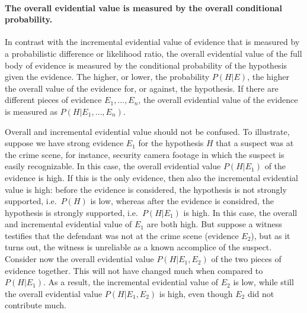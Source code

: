 \documentclass[10pt]{article}
\begin{document}


\paragraph{The overall evidential value is measured by the overall conditional probability. }

In contrast with the incremental evidential value of evidence that is measured by a probabilistic difference or likelihood ratio, the overall evidential value of the full body of evidence is measured by the conditional probability of the hypothesis given the evidence. The higher, or lower, the probability $P(H|E)$, the higher 
the overall value of the evidence for, or against, the hypothesis. If there are different pieces of evidence $E_1, \ldots, E_n$, the overall evidential value of the evidence is measured as $P(H|E_1, \ldots, E_n)$.

Overall and incremental evidential value should not be confused. To illustrate, suppose we have strong evidence $E_1$ for the hypothesis $H$ 
that a suspect was at the crime scene, for instance, security camera footage in which the suspect is easily recognizable. 
In this case, the overall evidential value $P(H|E_1)$ of the evidence is high. If this is the only evidence, then also the 
incremental evidential value is high: before the evidence is considered, the hypothesis is not strongly supported, i.e.\ $P(H)$ is low, whereas after the evidence is considred, 
the hypothesis is strongly supported, i.e.\ $P(H|E_1)$ is high. In this case, the overall and incremental evidential value of $E_1$ are both high. 
But suppose a witness testifies that the defendant was not at the crime scene (evidence $E_2$), but as it turns out, the witness is unreliable 
as a known accomplice of the suspect. Consider now the overall evidential value $P(H|E_1, E_2)$ of the two pieces of evidence together. This will not have changed much when compared to $P(H|E_1)$. As a result, the incremental evidential value of $E_2$ is low, while still the overall evidential value $P(H|E_1, E_2)$ is high, even though $E_2$ did not contribute much. 
\end{document}
